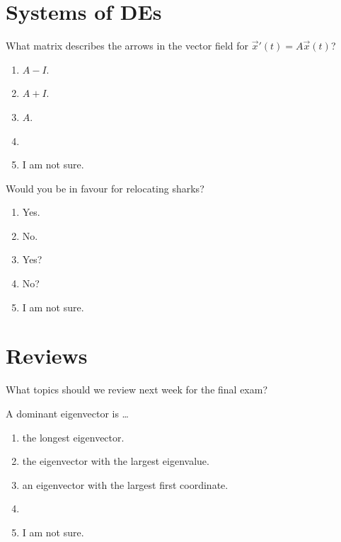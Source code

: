 \documentclass[aspectratio=169, t, 14pt]{beamer}
\begin{document}
\section{Systems of DEs}

\begin{frame}
  What matrix describes the arrows in the vector field for \(\vec{x}'(t) = A \vec{x}(t)\)?

  \begin{enumerate}
    \item \(A - I\).
    \item \(A + I\).
    \item \(A\). 
    \item 
    \item I am not sure.
  \end{enumerate}
\end{frame}

\begin{frame}
  Would you be in favour for relocating sharks?

  \begin{enumerate}
    \item Yes.
    \item No.
    \item Yes?
    \item No?
    \item I am not sure.
  \end{enumerate}
\end{frame}

\section{Reviews}

\begin{frame}[c]
  What topics should we review next week for the final exam?
\end{frame}

\begin{frame}
  A dominant eigenvector is \ldots{}

  \begin{enumerate}
    \item the longest eigenvector.
    \item the eigenvector with the largest eigenvalue.
    \item an eigenvector with the largest first coordinate.
    \item 
    \item I am not sure.
  \end{enumerate}
\end{frame}
\end{document}
